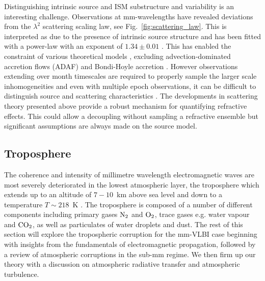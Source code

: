 Distinguishing intrinsic source and ISM substructure and variability is an interesting challenge. Observations at mm-wavelengths have revealed deviations from the $\lambda^2$ scattering scaling law, see Fig.~\ref{fig:scattering_law}. This is interpreted as due to the presence of intrinsic source structure and has been fitted with a power-law with an exponent of $1.34 \pm 0.01$ \cite{Lu_2011}. This has enabled the constraint of various theoretical models \cite{Bower_2006}, excluding advection-dominated accretion flows (ADAF) \cite{Narayan_1998} and Bondi-Hoyle accretion \cite{Melia_1994}. However observations extending over month timescales are required to properly sample the larger scale inhomogeneities and even with multiple epoch observations, it can be difficult to distinguish source and scattering characteristics \citep*{Macquart_2006}. The developments in scattering theory presented above provide a robust mechanism for quantifying refractive effects. This could allow a decoupling without sampling a refractive ensemble but significant assumptions are always made on the source model. 


\subsection{Troposphere}\label{sec:trop}

The coherence and intensity of millimetre wavelength electromagnetic waves are most severely deteriorated in the lowest atmospheric layer, the troposphere which extends up to an altitude of $7-10$~km above sea level and down to a temperature $T \sim 218$~K \citep{Thompson_2001}. The troposphere is composed of a number of different components including primary gases $\rm N_2$ and  $\rm O_2$, trace gases e.g. water vapour and ${\rm CO_2}$, as well as particulates of water droplets and dust. The rest of this section will explore the tropospheric corruption for the mm-VLBI case beginning with insights from the fundamentals of electromagnetic propagation, followed by a review of atmospheric corruptions in the sub-mm regime. We then firm up our theory with a discussion on atmospheric radiative transfer and atmospheric turbulence. 


